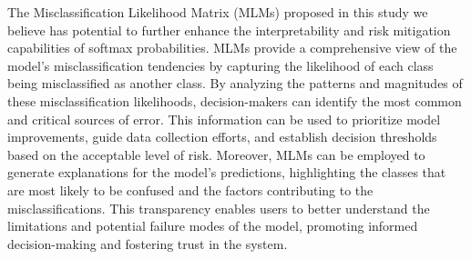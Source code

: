 The Misclassification Likelihood Matrix (MLMs) proposed in this study we believe has potential to further enhance the interpretability and risk mitigation capabilities of softmax probabilities. MLMs provide a comprehensive view of the model's misclassification tendencies by capturing the likelihood of each class being misclassified as another class. By analyzing the patterns and magnitudes of these misclassification likelihoods, decision-makers can identify the most common and critical sources of error. This information can be used to prioritize model improvements, guide data collection efforts, and establish decision thresholds based on the acceptable level of risk. Moreover, MLMs can be employed to generate explanations for the model's predictions, highlighting the classes that are most likely to be confused and the factors contributing to the misclassifications. This transparency enables users to better understand the limitations and potential failure modes of the model, promoting informed decision-making and fostering trust in the system.





